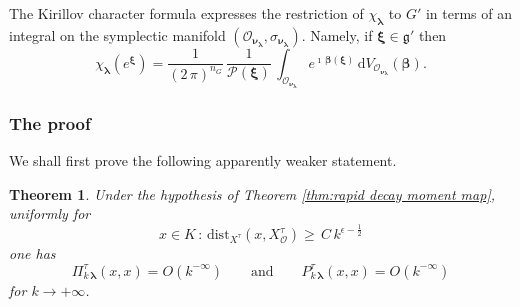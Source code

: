 \documentclass[12pt,a4paper]{article}
\theoremstyle{plain}
\newtheorem{thm}{Theorem}[section]
\theoremstyle{definition}
\begin{document}
The Kirillov character formula expresses the restriction of 
$\chi_{\boldsymbol{\lambda}}$ to $G'$ in 
terms of an integral on
the symplectic manifold $(\mathcal{O}_{\boldsymbol{\nu}_{\boldsymbol{\lambda}}},\sigma_{\boldsymbol{\nu}_{\boldsymbol{\lambda}}})$. Namely, if 
$\boldsymbol{\xi}\in \mathfrak{g}'$ then
%
\begin{equation}
\label{eqn:kir char form}
\chi_{\boldsymbol{\lambda}}
\left(e^{\boldsymbol{\xi}}\right)
=\frac{1}{(2\,\pi)^{n_G}}\,
\frac{1}{\mathcal{P}(\boldsymbol{\xi})}\,
\int_{\mathcal{O}_{\boldsymbol{\nu}_{\boldsymbol{\lambda}}}}
e^{\imath\,\boldsymbol{\beta}(\boldsymbol{\xi})}\,
\mathrm{d}
V_{\mathcal{O}_{\boldsymbol{\nu}_{\boldsymbol{\lambda}}}}
(\boldsymbol{\beta}).
\end{equation}


\subsubsection{The proof}

We shall first prove the following 
apparently weaker statement.

\begin{thm}
\label{thm:rapid decay moment map diag}
Under the hypothesis of Theorem \ref{thm:rapid decay moment map},
 uniformly for
\begin{equation}
\label{eqn:bound distance momentO1}
x\in K\,:\,\mathrm{dist}_{X^\tau}
\left(x,X^\tau_{\mathcal{O}}\right)
%
\ge \,C\,k^{\epsilon-\frac{1}{2}}
\end{equation}
%
one has
$$
\Pi^\tau_{k\,\boldsymbol{\lambda}}(x,x)=
O\left(k^{-\infty}\right)\qquad
\text{and}\qquad P^\tau_{k\,\boldsymbol{\lambda}}(x,x)=
O\left(k^{-\infty}\right)
$$
for $k\rightarrow +\infty$.

\end{thm}
\end{document}
